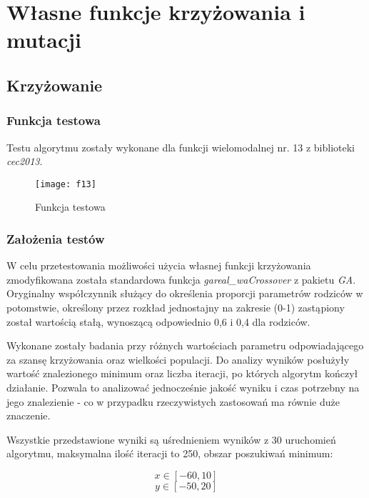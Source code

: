 \section{Własne funkcje krzyżowania i mutacji}

\subsection{Krzyżowanie}

\subsubsection{Funkcja testowa}
Testu algorytmu zostały wykonane dla funkcji wielomodalnej nr. 13 z biblioteki \textit{cec2013}.

\begin{figure}[H]
	\centering
	\texttt{[image: f13]}
	\caption{Funkcja testowa}
\end{figure}

\subsubsection{Założenia testów}

W celu przetestowania możliwości użycia własnej funkcji krzyżowania zmodyfikowana została standardowa funkcja \textit{gareal\_waCrossover} z pakietu \textit{GA}.
Oryginalny współczynnik służący do określenia proporcji parametrów rodziców w potomstwie,
określony przez rozkład jednostajny na zakresie (0-1) zastąpiony został wartością stałą, wynoszącą odpowiednio 0,6 i 0,4 dla rodziców.

Wykonane zostały badania przy różnych wartościach parametru odpowiadającego za szansę krzyżowania oraz wielkości populacji.
Do analizy wyników posłużyły wartość znalezionego minimum oraz liczba iteracji, po których algorytm kończył działanie.
Pozwala to analizować jednocześnie jakość wyniku i czas potrzebny na jego znalezienie - co w przypadku rzeczywistych zastosowań ma równie duże znaczenie.

Wszystkie przedstawione wyniki są uśrednieniem wyników z 30 uruchomień algorytmu, maksymalna ilość iteracji to 250, obszar poszukiwań minimum:

\begin{equation}
x\in [-60, 10]
\nonumber
\end{equation}
\begin{equation}
y\in [-50, 20]
\nonumber
\end{equation}

